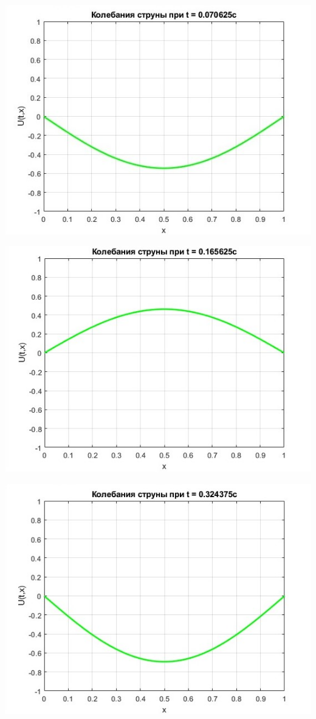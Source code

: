 \documentclass[a4paper]{article}
\begin{document}
\includegraphics{img/1_2.jpg}

\includegraphics{img/1_3.jpg}

\includegraphics{img/1_4.jpg}

\newpage
\end{document}
